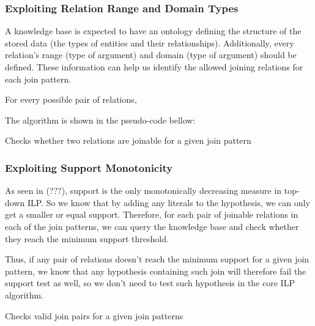 \subsubsection{Exploiting Relation Range and Domain Types}

A knowledge base is expected to have an ontology defining the structure of the stored data (the types of entities and their relationships). Additionally, every relation's range (type of  argument) and domain (type of  argument) should be defined. These information can help us identify the allowed joining relations for each join pattern.

For every possible pair of relations, 

The algorithm is shown in the pseudo-code bellow:

\begin{algorithm}[5]
 \caption{Checks whether two relations are joinable for a given join pattern}
 
\end{algorithm}

\subsubsection{Exploiting Support Monotonicity}

As seen in (???), support is the only monotonically decreasing measure in top-down ILP. So we know that by adding any literals to the hypothesis, we can only get a smaller or equal support. Therefore, for each pair of joinable relations in each of the join patterns, we can query the knowledge base and check whether they reach the minimum support threshold.

Thus, if any pair of relations doesn't reach the minimum support for a given join pattern, we know that any hypothesis containing such join will therefore fail the support test as well, so we don't need to test such hypothesis in the core ILP algorithm.


\begin{algorithm}
  \caption{Checks valid join pairs for a given join patterns}
  
\end{algorithm}


